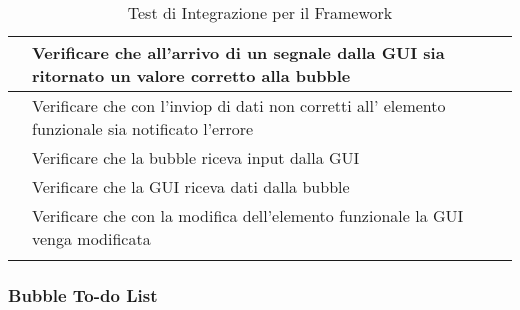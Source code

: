 \begin{longtable}{|c|P{9cm}|c|}
	\hline {} & Verificare che all'arrivo di un segnale dalla GUI sia ritornato un valore corretto alla bubble &  \\
	\hline {} & Verificare che con l'inviop di dati non corretti  all’ elemento funzionale sia notificato l’errore &  \\
	\hline {} & Verificare che la bubble riceva input dalla GUI & \\
	\hline {} & Verificare che la GUI riceva dati dalla bubble & \\
	\hline {} & Verificare che con la modifica dell'elemento funzionale la GUI venga modificata & \\
	\hline
	\caption{Test di Integrazione per il Framework}
\end{longtable}

\subsubsection{Bubble To-do List}

